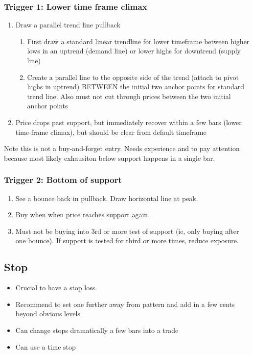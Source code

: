 \documentclass{../notes}
\begin{document}
\subsubsection{Trigger 1: Lower time frame climax}
\begin{enumerate}
  \item Draw a parallel trend line pullback
  \begin{enumerate}
    \item First draw a standard linear trendline for lower timeframe between higher lows in an uptrend (demand line) or lower highs for downtrend (supply line)
    \item Create a parallel line to the opposite side of the trend (attach to pivot highs in uptrend) BETWEEN the initial two anchor points for standard trend line. Also must not cut through prices between the two initial anchor points
  \end{enumerate}
  \item Price drops past support, but immediately recover within a few bars (lower time-frame climax), but should be clear from default timeframe
\end{enumerate}
Note this is not a buy-and-forget entry. Needs experience and to pay attention because most likely exhausiton below support happens in a single bar.

\subsubsection{Trigger 2: Bottom of support}
\begin{enumerate}
  \item See a bounce back in pullback. Draw horizontal line at peak.
  \item Buy when when price reaches support again.
  \item Must not be buying into 3rd or more test of support (ie, only buying after one bounce). If support is tested for third or more times, reduce exposure.
\end{enumerate}
\subsection{Stop}
\begin{itemize}
  \item Crucial to have a stop loss.
  \item Recommend to set one further away from pattern and add in a few cents beyond obvious levels
  \item Can change stops dramatically a few bars into a trade
  \item Can use a time stop
\end{itemize}
\end{document}
